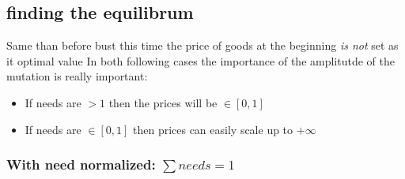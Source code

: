 \documentclass[a4paper]{article}
\begin{document}
	\subsection{finding the equilibrum}

	Same than before bust this time the price of goods at the beginning \emph{is not} set as it optimal value
	In both following cases the importance of the amplitutde of the mutation is really important:
		\begin{itemize}
		    \item If needs  are $> 1$ then the prices will be $\in [0,1]$
		    \item If needs  are $\in [0,1]$ then prices can easily scale up to $+\infty$

		\end{itemize}

	\subsubsection{With need normalized: $\sum{needs}=1$}
		
\end{document}
